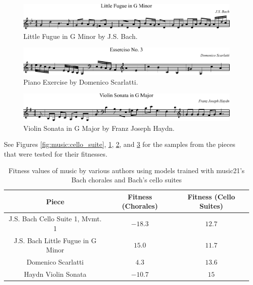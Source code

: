 \begin{figure}[]
	\centering
	\includegraphics[width=\linewidth]{figures/little_fugue.pdf}
	\caption{Little Fugue in G Minor by J.S. Bach.}
	\label{fig:music:little_fugue}
\end{figure}

\begin{figure}[]
	\centering
	\includegraphics[width=\linewidth]{figures/scarlatti.pdf}
	\caption{Piano Exercise by Domenico Scarlatti.}
	\label{fig:music:scarlatti}
\end{figure}

\begin{figure}[]
	\centering
	\includegraphics[width=\linewidth]{figures/haydn.pdf}
	\caption{Violin Sonata in G Major by Franz Joseph Haydn.}
	\label{fig:music:haydn}
\end{figure}

See Figures \ref{fig:music:cello_suite}, \ref{fig:music:little_fugue}, \ref{fig:music:scarlatti}, and \ref{fig:music:haydn} for the samples from the pieces that were tested for their fitnesses.

\begin{table}[]
	\centering
	\begin{tabular}{c | c c}
		Piece & Fitness (Chorales) & Fitness (Cello Suites) \\
		\hline
		J.S. Bach Cello Suite 1, Mvmt. 1 & $-18.3$ & $12.7$ \\
		J.S. Bach Little Fugue in G Minor & $15.0$ & $11.7$ \\
		Domenico Scarlatti & $4.3$ & $13.6$ \\
		Haydn Violin Sonata & $-10.7$ & $15$ %
	\end{tabular}
	\caption{Fitness values of music by various authors using models trained with music21's Bach chorales and Bach's cello suites}
	\label{table:fitnesscomp}
\end{table}

